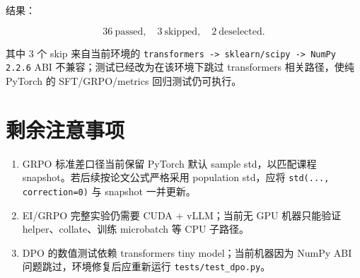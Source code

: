 \documentclass[UTF8,a4paper,11pt]{ctexart}
\begin{document}
结果：

\[
  36\ \text{passed},\quad
  3\ \text{skipped},\quad
  2\ \text{deselected}.
\]

其中 3 个 skip 来自当前环境的 \texttt{transformers -> sklearn/scipy -> NumPy 2.2.6} ABI 不兼容；测试已经改为在该环境下跳过 transformers 相关路径，使纯 PyTorch 的 SFT/GRPO/metrics 回归测试仍可执行。

\section{剩余注意事项}

\begin{enumerate}[leftmargin=2em]
  \item GRPO 标准差口径当前保留 PyTorch 默认 sample std，以匹配课程 snapshot。若后续按论文公式严格采用 population std，应将 \texttt{std(..., correction=0)} 与 snapshot 一并更新。
  \item EI/GRPO 完整实验仍需要 CUDA + vLLM；当前无 GPU 机器只能验证 helper、collate、训练 microbatch 等 CPU 子路径。
  \item DPO 的数值测试依赖 transformers tiny model；当前机器因为 NumPy ABI 问题跳过，环境修复后应重新运行 \texttt{tests/test\_dpo.py}。
\end{enumerate}
\end{document}
